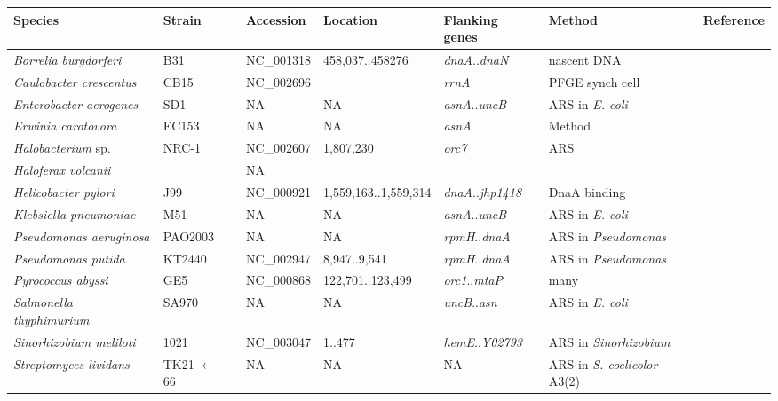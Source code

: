 \begin{table}[ht]
\begin{center}
\tiny
\begin{tabular}{lllllll}
\hline \hline
Species & Strain & Accession & Location & Flanking genes& Method & Reference\\
\hline
\textit{Borrelia burgdorferi} & B31 & NC\_001318 & 458,037..458276 & \textit{dnaA}..\textit{dnaN}& nascent DNA & \cite{PicardeauM1999}\\
\textit{Caulobacter crescentus} & CB15 & NC\_002696 &  & \textit{rrnA} & PFGE synch cell & \cite{DingwallA1989}\\
\textit{Enterobacter aerogenes} & SD1 & NA & NA & \textit{asnA}..\textit{uncB}& ARS in \textit{E. coli} & \cite{HardingNE1982}\\
\textit{Erwinia carotovora} & EC153 & NA & NA & \textit{asnA}& Method & \cite{TakedaY1982}\\

\textit{Halobacterium} sp. & NRC-1 & NC\_002607 & 1,807,230 & \textit{orc7}& ARS & \cite{BerquistBR2003}\\
\textit{Haloferax volcanii} &  & NA &  & &  & \cite{NoraisC2007}\\

\textit{Helicobacter pylori} & J99 & NC\_000921& 1,559,163..1,559,314& \textit{dnaA}..\textit{jhp1418}& DnaA binding & \cite{ZawilakA2001}\\
\textit{Klebsiella pneumoniae} & M51 & NA & NA & \textit{asnA}..\textit{uncB}& ARS in \textit{E. coli} & \cite{HardingNE1982}\\
\textit{Pseudomonas aeruginosa} & PAO2003 & NA & NA & \textit{rpmH}..\textit{dnaA}& ARS in \textit{Pseudomonas} & \cite{YeeTW1990}\\
\textit{Pseudomonas putida} & KT2440 & NC\_002947 & 8,947..9,541 & \textit{rpmH}..\textit{dnaA}& ARS in \textit{Pseudomonas} & \cite{YeeTW1990}\\
\textit{Pyrococcus abyssi} & GE5 & NC\_000868 & 122,701..123,499 & \textit{orc1}..\textit{mtaP}& many & \cite{MyllykallioH2000, MatsunagaF2001, MatsunagaF2003}\\
\textit{Salmonella thyphimurium} & SA970 & NA & NA & \textit{uncB}..\textit{asn} & ARS in \textit{E. coli} & \cite{ZyskindJW1979, ZyskindJW1980}\\
\textit{Sinorhizobium meliloti} & 1021 & NC\_003047 & 1..477 & \textit{hemE}..\textit{Y02793} & ARS in \textit{Sinorhizobium} & \cite{SibleyCD2006}\\
\textit{Streptomyces lividans} & TK21 $\leftarrow$ 66 & NA & NA & NA & ARS in \textit{S. coelicolor} A3(2) & \cite{ZakrezewskaCzerwinskaJ1992} \\


\end{tabular}
\end{center}
\end{table}
